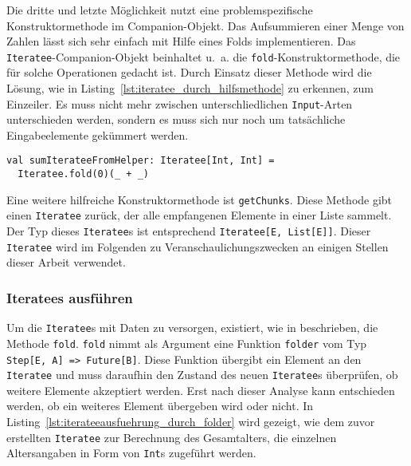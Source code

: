 Die dritte und letzte Möglichkeit nutzt eine problemspezifische Konstruktormethode im Companion-Objekt.
Das Aufsummieren einer Menge von Zahlen lässt sich sehr einfach mit Hilfe eines Folds implementieren.
Das \lstinline|Iteratee|-Companion-Objekt beinhaltet u.~a. die \lstinline|fold|-Konstruktormethode, die für solche Operationen gedacht ist.
Durch Einsatz dieser Methode wird die Lösung, wie in Listing~\ref{lst:iteratee_durch_hilfsmethode} zu erkennen, zum Einzeiler.
Es muss nicht mehr zwischen unterschliedlichen \lstinline|Input|-Arten unterschieden werden, sondern es muss sich nur noch um tatsächliche Eingabeelemente gekümmert werden.

\begin{lstlisting}[caption=Erstellung eines Iteratees durch Konstruktormethode im Companion-Objekt, label=lst:iteratee_durch_hilfsmethode]
val sumIterateeFromHelper: Iteratee[Int, Int] =
  Iteratee.fold(0)(_ + _)
\end{lstlisting}

Eine weitere hilfreiche Konstruktormethode ist \lstinline|getChunks|.
Diese Methode gibt einen \lstinline|Iteratee| zurück, der alle empfangenen Elemente in einer Liste sammelt.
Der Typ dieses \lstinline|Iteratee|s ist entsprechend \lstinline|Iteratee[E, List[E]]|.
Dieser \lstinline|Iteratee| wird im Folgenden zu Veranschaulichungszwecken an einigen Stellen dieser Arbeit verwendet.



\subsubsection{Iteratees ausführen} %
\label{ssub:iteratees_ausfuehren}

Um die \lstinline|Iteratee|s mit Daten zu versorgen, existiert, wie in  beschrieben, die Methode \lstinline|fold|.
\lstinline|fold| nimmt als Argument eine Funktion \lstinline|folder| vom Typ \lstinline[breaklines=true]|Step[E, A] => Future[B]|.
Diese Funktion übergibt ein Element an den \lstinline|Iteratee| und muss daraufhin den Zustand des neuen \lstinline|Iteratee|s überprüfen, ob weitere Elemente akzeptiert werden.
Erst nach dieser Analyse kann entschieden werden, ob ein weiteres Element übergeben wird oder nicht.
In Listing~\ref{lst:iterateeausfuehrung_durch_folder} wird gezeigt, wie dem zuvor erstellten \lstinline|Iteratee| zur Berechnung des Gesamtalters, die einzelnen Altersangaben in Form von \lstinline|Int|s zugeführt werden.

